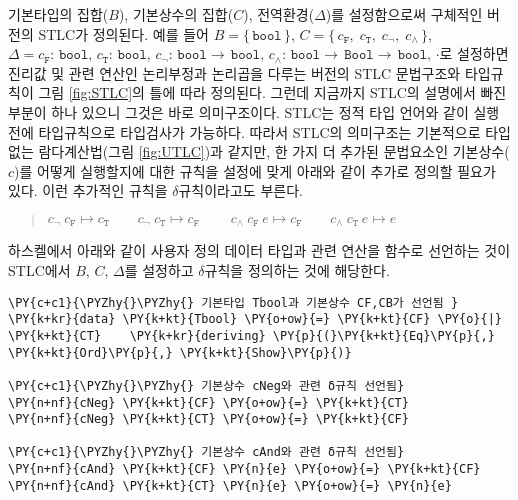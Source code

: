     기본타입의 집합(\(B\)), 기본상수의 집합(\(C\)), 전역환경(\(\Delta\))를
설정함으로써 구체적인 버전의 STLC가 정의된다. 예를 들어
\(B = \{\,\texttt{bool}\,\}\),
\(C = \{\,c_\texttt{F},\;c_\texttt{T},\;c_\neg,\;c_\land\,\}\),
\(\Delta = c_\texttt{F}{:\,}\texttt{bool}, \, c_\texttt{T}{:\,}\texttt{bool}, \, c_\neg{:\,}\texttt{bool}{\to\,}\texttt{bool}, \,  c_\land{:\,}\texttt{bool}{\to\,}\texttt{Bool}{\to\,}\texttt{bool}, \, \bm{\cdot}\)로
설정하면 진리값 및 관련 연산인 논리부정과 논리곱을 다루는 버전의 STLC
문법구조와 타입규칙이 그림 \ref{fig:STLC}의 틀에 따라 정의된다. 그런데
지금까지 STLC의 설명에서 빠진 부분이 하나 있으니 그것은 바로
의미구조이다. STLC는 정적 타입 언어와 같이 실행 전에 타입규칙으로
타입검사가 가능하다. 따라서 STLC의 의미구조는 기본적으로 타입없는
람다계산법(그림 \ref{fig:UTLC})과 같지만, 한 가지 더 추가된 문법요소인
기본상수(\(c\))를 어떻게 실행할지에 대한 규칙을 설정에 맞게 아래와 같이
추가로 정의할 필요가 있다. 이런 추가적인 규칙을 \(\delta\)규칙이라고도
부른다.\vspace*{-1.5ex}
\begin{quote}
    \(c_\neg ~ c_\texttt{F} \longmapsto c_\texttt{T} \qquad  c_\neg ~ c_\texttt{T} \longmapsto c_\texttt{F} \qquad~  c_\land ~ c_\texttt{F} ~ e \longmapsto c_\texttt{F} \qquad  c_\land ~ c_\texttt{T} ~ e \longmapsto e\)
\end{quote}
    하스켈에서 아래와 같이 사용자 정의 데이터 타입과 관련 연산을 함수로
선언하는 것이 STLC에서 \(B\), \(C\), \(\Delta\)를 설정하고
\(\delta\)규칙을 정의하는 것에 해당한다.

    \begin{tcolorbox}[breakable, size=fbox, boxrule=1pt, pad at break*=1mm,colback=cellbackground, colframe=cellborder, top=.75ex]
\begin{Verbatim}[commandchars=\\\{\}]
\PY{c+c1}{\PYZhy{}\PYZhy{} 기본타입 Tbool과 기본상수 CF,CB가 선언됨 }
\PY{k+kr}{data} \PY{k+kt}{Tbool} \PY{o+ow}{=} \PY{k+kt}{CF} \PY{o}{|} \PY{k+kt}{CT}    \PY{k+kr}{deriving} \PY{p}{(}\PY{k+kt}{Eq}\PY{p}{,} \PY{k+kt}{Ord}\PY{p}{,} \PY{k+kt}{Show}\PY{p}{)}

\PY{c+c1}{\PYZhy{}\PYZhy{} 기본상수 cNeg와 관련 δ규칙 선언됨}
\PY{n+nf}{cNeg} \PY{k+kt}{CF} \PY{o+ow}{=} \PY{k+kt}{CT}
\PY{n+nf}{cNeg} \PY{k+kt}{CT} \PY{o+ow}{=} \PY{k+kt}{CF}

\PY{c+c1}{\PYZhy{}\PYZhy{} 기본상수 cAnd와 관련 δ규칙 선언됨}
\PY{n+nf}{cAnd} \PY{k+kt}{CF} \PY{n}{e} \PY{o+ow}{=} \PY{k+kt}{CF}
\PY{n+nf}{cAnd} \PY{k+kt}{CT} \PY{n}{e} \PY{o+ow}{=} \PY{n}{e}
\end{Verbatim}
\end{tcolorbox}

